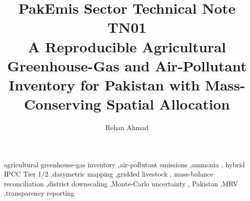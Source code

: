 \documentclass[5p,times,authoryear]{elsarticle}
\begin{document}
\begin{frontmatter}

\title{PakEmis Sector Technical Note TN01\\[4pt]
A Reproducible Agricultural Greenhouse-Gas and Air-Pollutant Inventory
for Pakistan with Mass-Conserving Spatial Allocation}

\author[paqi]{Rehan Ahmad}

\address[paqi]{Pakistan Air Quality Initiative (PAQI), Karachi, Pakistan}


\begin{abstract}

\end{abstract}

\begin{keyword}
agricultural greenhouse-gas inventory \sep air-pollutant emissions \sep ammonia \sep
hybrid IPCC Tier 1/2 \sep dasymetric mapping \sep gridded livestock \sep
mass-balance reconciliation \sep district downscaling \sep Monte-Carlo uncertainty \sep
Pakistan \sep MRV \sep transparency reporting
\end{keyword}

\end{frontmatter}



\ReleaseCover










\FloatBarrier

\FloatBarrier

\FloatBarrier

\FloatBarrier

\FloatBarrier

\end{document}
